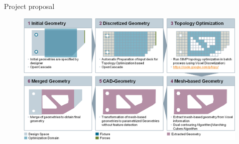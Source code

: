 \begin{frame}{Project proposal}
\begin{figure}

\includegraphics[width=\textwidth]{Pictures/OldPipeline.png}

\end{figure}
\end{frame}



